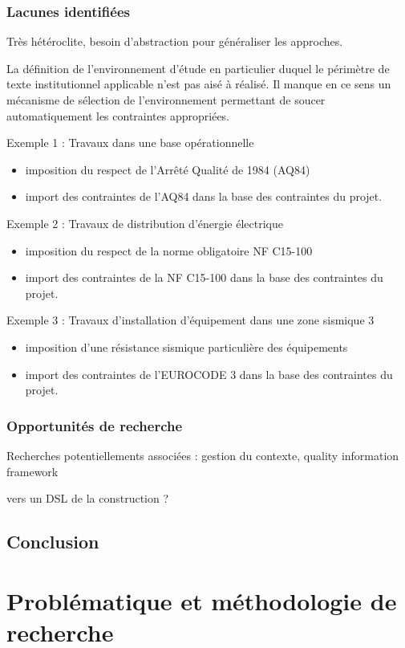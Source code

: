\documentclass[a4paper,12pt]{article}
\begin{document}
\subsubsection{Lacunes identifiées}
\label{sec:org4b73742}
Très hétéroclite, besoin d’abstraction pour généraliser les approches.

La définition de l'environnement d'étude en particulier duquel le périmètre de texte institutionnel applicable n'est pas aisé à réalisé.
Il manque en ce sens un mécanisme de sélection de l'environnement permettant de soucer automatiquement les contraintes appropriées.

Exemple 1 : Travaux dans une base opérationnelle
\begin{itemize}
\item imposition du respect de l'Arrêté Qualité de 1984 (AQ84)
\item import des contraintes de l'AQ84 dans la base des contraintes du projet.
\end{itemize}


Exemple 2 : Travaux de distribution d'énergie électrique
\begin{itemize}
\item imposition du respect de la norme obligatoire NF C15-100
\item import des contraintes de la NF C15-100 dans la base des contraintes du projet.
\end{itemize}


Exemple 3 : Travaux d'installation d'équipement dans une zone sismique 3
\begin{itemize}
\item imposition d'une résistance sismique particulière des équipements
\item import des contraintes de l'EUROCODE 3 dans la base des contraintes du projet.
\end{itemize}
\subsubsection{Opportunités de recherche}
\label{sec:orgc7df853}
Recherches potentiellements associées : gestion du contexte, quality information framework

vers un DSL de la construction ?
\subsection{Conclusion}
\label{sec:org9356486}
\clearpage
\section{Problématique et méthodologie de recherche}
\label{sec:org3745661}
\end{document}
